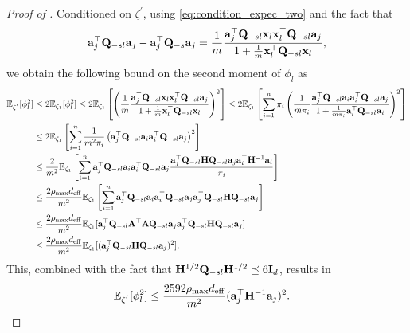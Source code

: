 \documentclass[11pt,a4paper]{article}
\begin{document}
\begin{proof}[Proof of ]
Conditioned on $\zeta^{'}$,  using \eqref{eq:condition_expec_two} and the fact that
\begin{align}
    \mathbf{a}_j^\top\mathbf{Q}_{-sl}\mathbf{a}_j-\mathbf{a}_j^\top\mathbf{Q}_{-s}\mathbf{a}_j=\frac{1}{m}\frac{\mathbf{a}_j^\top\mathbf{Q}_{-sl}\mathbf{x}_l\mathbf{x}_l^\top\mathbf{Q}_{-sl}\mathbf{a}_j}{1+\frac{1}{m}\mathbf{x}_l^\top\mathbf{Q}_{-sl}\mathbf{x}_l},\nonumber
\end{align}
we obtain the following bound on the second moment of $\phi_l$ as 
\begin{align*} 
    {\mathbb{E}}_{\zeta^{'}}[\phi_l^2] &\leq 2{\mathbb{E}}_{\zeta_1} [\phi_l^2] \leq2{\mathbb{E}}_{\zeta_1}\left[ \left( \frac{1}{m}\frac{\mathbf{a}_j^\top\mathbf{Q}_{-sl}\mathbf{x}_l\mathbf{x}_l^\top\mathbf{Q}_{-sl}\mathbf{a}_j}{1+\frac{1}{m}\mathbf{x}_l^\top\mathbf{Q}_{-sl}\mathbf{x}_l}\right)^2\right] \leq 2{\mathbb{E}}_{\zeta_1}\left[\sum^n_{i=1} \pi_i\left( \frac{1}{m\pi_i}\frac{\mathbf{a}_j^\top\mathbf{Q}_{-sl}\mathbf{a}_i\mathbf{a}_i^\top\mathbf{Q}_{-sl}\mathbf{a}_j}{1+\frac{1}{m\pi_i}\mathbf{a}_i^\top\mathbf{Q}_{-sl}\mathbf{a}_i}\right)^2\right] \nonumber\\
     &\leq 2{\mathbb{E}}_{\zeta_1}\left[\sum^n_{i=1} \frac{1}{m^2\pi_i}\left( \mathbf{a}_j^\top\mathbf{Q}_{-sl}\mathbf{a}_i\mathbf{a}_i^\top\mathbf{Q}_{-sl}\mathbf{a}_j\right)^2\right] \\
     &\leq \frac{2}{m^2}{\mathbb{E}}_{\zeta_1}\left[\sum^n_{i=1}\mathbf{a}_j^\top\mathbf{Q}_{-sl}\mathbf{a}_i\mathbf{a}_i^\top\mathbf{Q}_{-sl}\mathbf{a}_j \frac{\mathbf{a}_j^\top\mathbf{Q}_{-sl}\mathbf{H}\mathbf{Q}_{-sl}\mathbf{a}_j\mathbf{a}_i^\top\mathbf{H}^{-1}\mathbf{a}_i}{\pi_i}\right] \nonumber\\
      &\leq \frac{2\rho_{\max} d_{\mathrm{eff}}}{m^2}{\mathbb{E}}_{\zeta_1}\left[\sum^n_{i=1}\mathbf{a}_j^\top\mathbf{Q}_{-sl}\mathbf{a}_i\mathbf{a}_i^\top\mathbf{Q}_{-sl}\mathbf{a}_j\mathbf{a}_j^\top\mathbf{Q}_{-sl}\mathbf{H}\mathbf{Q}_{-sl}\mathbf{a}_j \right] \\ 
      &\leq \frac{2\rho_{\max}  d_{\mathrm{eff}}}{m^2}{\mathbb{E}}_{\zeta_1}[\mathbf{a}_j^\top\mathbf{Q}_{-sl}\mathbf{A}^\top\mathbf{A}\mathbf{Q}_{-sl}\mathbf{a}_j \mathbf{a}_j^\top\mathbf{Q}_{-sl}\mathbf{H}\mathbf{Q}_{-sl}\mathbf{a}_j] \nonumber\\
      &\leq \frac{2\rho_{\max}  d_{\mathrm{eff}}}{m^2}{\mathbb{E}}_{\zeta_1}[ (\mathbf{a}_j^\top\mathbf{Q}_{-sl}\mathbf{H}\mathbf{Q}_{-sl}\mathbf{a}_j)^2].
   \nonumber
\end{align*} 
This, combined with the fact that $\mathbf{H}^{1/2}\mathbf{Q}_{-sl}\mathbf{H}^{1/2} \preceq6\mathbf{I}_d$, results in 
\begin{align}
    {\mathbb{E}}_{\zeta^{'}}[\phi_l^2] &\leq  \frac{2592\rho_{\max}  d_{\mathrm{eff}}}{m^2} (\mathbf{a}_j^\top\mathbf{H}^{-1}\mathbf{a}_j)^2.\nonumber
\end{align}



\end{proof}
\end{document}
